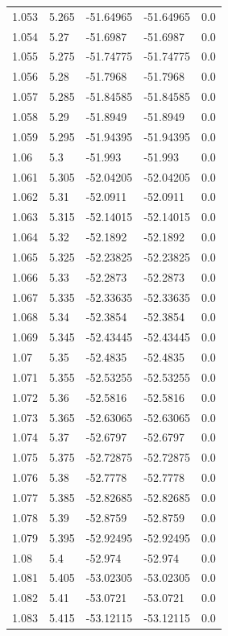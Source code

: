 \begin{tabular}{lllll}
1.053 & 5.265 & -51.64965 & -51.64965 & 0.0 \\
1.054 & 5.27 & -51.6987 & -51.6987 & 0.0 \\
1.055 & 5.275 & -51.74775 & -51.74775 & 0.0 \\
1.056 & 5.28 & -51.7968 & -51.7968 & 0.0 \\
1.057 & 5.285 & -51.84585 & -51.84585 & 0.0 \\
1.058 & 5.29 & -51.8949 & -51.8949 & 0.0 \\
1.059 & 5.295 & -51.94395 & -51.94395 & 0.0 \\
1.06 & 5.3 & -51.993 & -51.993 & 0.0 \\
1.061 & 5.305 & -52.04205 & -52.04205 & 0.0 \\
1.062 & 5.31 & -52.0911 & -52.0911 & 0.0 \\
1.063 & 5.315 & -52.14015 & -52.14015 & 0.0 \\
1.064 & 5.32 & -52.1892 & -52.1892 & 0.0 \\
1.065 & 5.325 & -52.23825 & -52.23825 & 0.0 \\
1.066 & 5.33 & -52.2873 & -52.2873 & 0.0 \\
1.067 & 5.335 & -52.33635 & -52.33635 & 0.0 \\
1.068 & 5.34 & -52.3854 & -52.3854 & 0.0 \\
1.069 & 5.345 & -52.43445 & -52.43445 & 0.0 \\
1.07 & 5.35 & -52.4835 & -52.4835 & 0.0 \\
1.071 & 5.355 & -52.53255 & -52.53255 & 0.0 \\
1.072 & 5.36 & -52.5816 & -52.5816 & 0.0 \\
1.073 & 5.365 & -52.63065 & -52.63065 & 0.0 \\
1.074 & 5.37 & -52.6797 & -52.6797 & 0.0 \\
1.075 & 5.375 & -52.72875 & -52.72875 & 0.0 \\
1.076 & 5.38 & -52.7778 & -52.7778 & 0.0 \\
1.077 & 5.385 & -52.82685 & -52.82685 & 0.0 \\
1.078 & 5.39 & -52.8759 & -52.8759 & 0.0 \\
1.079 & 5.395 & -52.92495 & -52.92495 & 0.0 \\
1.08 & 5.4 & -52.974 & -52.974 & 0.0 \\
1.081 & 5.405 & -53.02305 & -53.02305 & 0.0 \\
1.082 & 5.41 & -53.0721 & -53.0721 & 0.0 \\
1.083 & 5.415 & -53.12115 & -53.12115 & 0.0 \\

\end{tabular}
